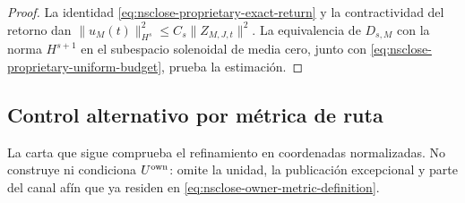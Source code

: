 \begin{proof}
La identidad \eqref{eq:nsclose-proprietary-exact-return} y la contractividad
del retorno dan
\(\|u_M(t)\|_{H^s}^2\le C_s\|Z_{M,J,t}\|^2\). La equivalencia de
\(D_{s,M}\) con la norma \(H^{s+1}\) en el subespacio solenoidal de media
cero, junto con \eqref{eq:nsclose-proprietary-uniform-budget}, prueba la
estimación.
\end{proof}

\subsection{Control alternativo por métrica de ruta}

La carta que sigue comprueba el refinamiento en coordenadas normalizadas. No
construye ni condiciona \(U^{\rm own}\): omite la unidad, la publicación
excepcional y parte del canal afín que ya residen en
\eqref{eq:nsclose-owner-metric-definition}.

